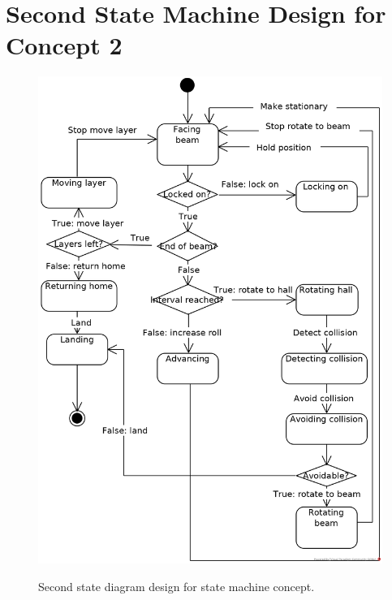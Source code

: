 \chapter{Second State Machine Design for Concept 2}
\label{app:bar_states_two}
\begin{figure}[h]
	\centering
	\includegraphics[height=0.6\textheight]{img/Bar_following_state_machine}
	\label{fig:bar_states_two}
	\caption{Second state diagram design for state machine concept.}
\end{figure}